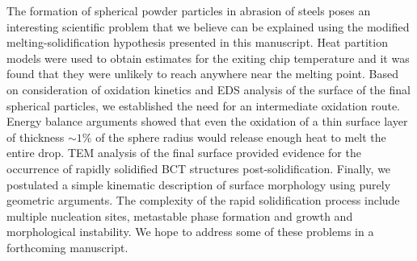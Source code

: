 \documentclass[11pt]{article}
\begin{document}
The formation of spherical powder particles in abrasion of steels poses an interesting scientific problem that we believe can be explained using the modified melting-solidification hypothesis presented in this manuscript. Heat partition models were used to obtain estimates for the exiting chip temperature and it was found that they were unlikely to reach anywhere near the melting point. Based on consideration of oxidation kinetics and EDS analysis of the surface of the final spherical particles, we established the need for an intermediate oxidation route. Energy balance arguments showed that even the oxidation of a thin surface layer of thickness $\sim 1\%$ of the sphere radius would release enough heat to melt the entire drop. TEM analysis of the final surface provided evidence for the occurrence of rapidly solidified BCT structures post-solidification. Finally, we postulated a simple kinematic description of surface morphology using purely geometric arguments. The complexity of the rapid solidification process include multiple nucleation sites, metastable phase formation and growth and morphological instability. We hope to address some of these problems in a forthcoming manuscript.     



\end{document}
